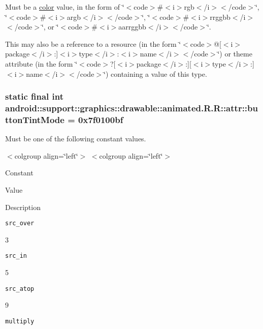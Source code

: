 Must be a \hyperlink{classandroid_1_1support_1_1graphics_1_1drawable_1_1animated_1_1_r_1_1color}{color} value, in the form of \char`\"{}$<$code$>$\#$<$i$>$rgb$<$/i$>$$<$/code$>$\char`\"{}, \char`\"{}$<$code$>$\#$<$i$>$argb$<$/i$>$$<$/code$>$\char`\"{}, \char`\"{}$<$code$>$\#$<$i$>$rrggbb$<$/i$>$$<$/code$>$\char`\"{}, or \char`\"{}$<$code$>$\#$<$i$>$aarrggbb$<$/i$>$$<$/code$>$\char`\"{}. 

This may also be a reference to a resource (in the form \char`\"{}$<$code$>$@\mbox{[}$<$i$>$package$<$/i$>$:\mbox{]}$<$i$>$type$<$/i$>$:$<$i$>$name$<$/i$>$$<$/code$>$\char`\"{}) or theme attribute (in the form \char`\"{}$<$code$>$?\mbox{[}$<$i$>$package$<$/i$>$:\mbox{]}\mbox{[}$<$i$>$type$<$/i$>$:\mbox{]}$<$i$>$name$<$/i$>$$<$/code$>$\char`\"{}) containing a value of this type. \hypertarget{classandroid_1_1support_1_1graphics_1_1drawable_1_1animated_1_1_r_1_1attr_b7da6435657ee12d8c680e3e82c19712}{
\subsubsection[{buttonTintMode}]{\setlength{\rightskip}{0pt plus 5cm}static final int android::support::graphics::drawable::animated.R.R::attr::buttonTintMode = 0x7f0100bf}}
\label{classandroid_1_1support_1_1graphics_1_1drawable_1_1animated_1_1_r_1_1attr_b7da6435657ee12d8c680e3e82c19712}


Must be one of the following constant values. \begin{TabularC}{0}
\hline
\end{TabularC}
$<$colgroup align=\char`\"{}left\char`\"{}$>$ $<$colgroup align=\char`\"{}left\char`\"{}$>$ 

Constant

Value

Description 

{\tt src\_\-over}

3

{\tt src\_\-in}

5

{\tt src\_\-atop}

9

{\tt multiply}

